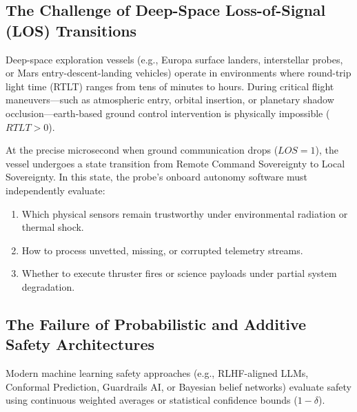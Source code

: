 \documentclass[journal]{IEEEtran}
\begin{document}
\subsection{The Challenge of Deep-Space Loss-of-Signal (LOS) Transitions}
Deep-space exploration vessels (e.g., Europa surface landers, interstellar probes, or Mars entry-descent-landing vehicles) operate in environments where round-trip light time (RTLT) ranges from tens of minutes to hours. During critical flight maneuvers---such as atmospheric entry, orbital insertion, or planetary shadow occlusion---earth-based ground control intervention is physically impossible ($RTLT > 0$).

At the precise microsecond when ground communication drops ($LOS = 1$), the vessel undergoes a state transition from Remote Command Sovereignty to Local Sovereignty. In this state, the probe's onboard autonomy software must independently evaluate:
\begin{enumerate}
    \item Which physical sensors remain trustworthy under environmental radiation or thermal shock.
    \item How to process unvetted, missing, or corrupted telemetry streams.
    \item Whether to execute thruster fires or science payloads under partial system degradation.
\end{enumerate}

\subsection{The Failure of Probabilistic and Additive Safety Architectures}
Modern machine learning safety approaches (e.g., RLHF-aligned LLMs, Conformal Prediction, Guardrails AI, or Bayesian belief networks) evaluate safety using continuous weighted averages or statistical confidence bounds ($1-\delta$).
\end{document}
